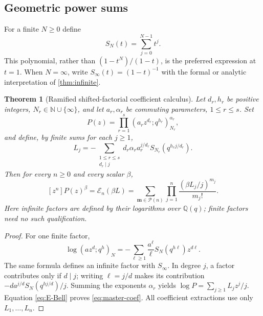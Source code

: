 \documentclass[11pt,a4paper]{article}
\numberwithin{equation}{section}
\newtheorem{theorem}{Theorem}[section]
\theoremstyle{definition}
\theoremstyle{remark}
\newcommand{\Q}{\mathbb Q}
\newcommand{\N}{\mathbb N}
\newcommand{\poch}[3]{(#1;#2)_{#3}}
\newcommand{\Ecal}{\mathcal E}
\newcommand{\Pcal}{\mathcal P}
\begin{document}
\subsection{Geometric power sums}
For a finite $N\ge0$ define
\begin{equation}\label{eq:S}
 S_N(t)=\sum_{j=0}^{N-1}t^j.
\end{equation}
This polynomial, rather than $(1-t^N)/(1-t)$, is the preferred expression at
$t=1$. When $N=\infty$, write $S_\infty(t)=(1-t)^{-1}$ with the formal or
analytic interpretation of \cref{thm:infinite}.

\begin{theorem}[Ramified shifted-factorial coefficient calculus]\label{thm:master}
Let $d_r,h_r$ be positive integers, $N_r\in\N\cup\{\infty\}$, and let
$a_r,\alpha_r$ be commuting parameters, $1\le r\le s$. Set
\begin{equation}\label{eq:master-P}
 P(z)=\prod_{r=1}^s\poch{a_r z^{d_r}}{q^{h_r}}{N_r}^{\alpha_r},
\end{equation}
and define, by finite sums for each $j\ge1$,
\begin{equation}\label{eq:master-L}
 L_j=-\sum_{\substack{1\le r\le s\\d_r\mid j}}
       d_r\alpha_r a_r^{j/d_r}
             S_{N_r}\!\left(q^{h_rj/d_r}\right).
\end{equation}
Then for every $n\ge0$ and every scalar $\beta$,
\begin{equation}\label{eq:master-coef}
 [z^n]P(z)^\beta
 =\Ecal_n(\beta L)
 =\sum_{\bm m\in\Pcal(n)}\prod_{j=1}^n
                   \frac{(\beta L_j/j)^{m_j}}{m_j!}.
\end{equation}
Here infinite factors are defined by their logarithms over $\Q(q)$; finite
factors need no such qualification.
\end{theorem}
\begin{proof}
For one finite factor,
\[
 \log\poch{az^d}{q^h}N
  =-\sum_{\ell\ge1}\frac{a^\ell}{\ell}
               S_N(q^{h\ell})z^{d\ell}.
\]
The same formula defines an infinite factor with $S_\infty$. In degree $j$, a
factor contributes only if $d\mid j$; writing $\ell=j/d$ makes its contribution
$-d a^{j/d}S_N(q^{hj/d})/j$. Summing the exponents $\alpha_r$ yields
$\log P=\sum_{j\ge1}L_jz^j/j$. Equation \eqref{eq:E-Bell} proves
\eqref{eq:master-coef}. All coefficient extractions use only $L_1,\ldots,L_n$.
\end{proof}
\end{document}
